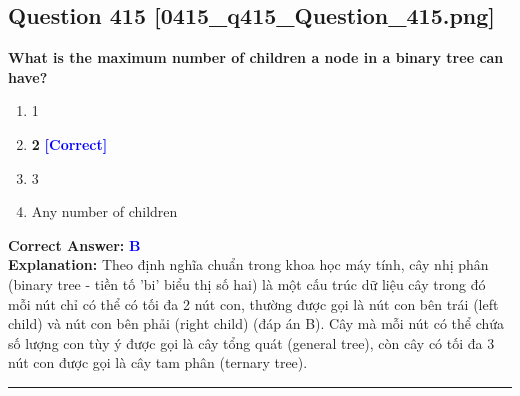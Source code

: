 \documentclass[11pt,a4paper]{article}
\begin{document}
\begin{minipage}{\textwidth}
\subsection*{Question 415 \quad \footnotesize{[0415\_q415\_Question\_415.png]}}
\noindent \textbf{What is the maximum number of children a node in a binary tree can have?}

\begin{enumerate}[label=\Alph*.]
    \item 1
    \item \textbf{2} \hfill \textcolor{blue}{\textbf{[Correct]}}
    \item 3
    \item Any number of children
\end{enumerate}

\noindent \textbf{Correct Answer:} \textcolor{blue}{\textbf{B}} \\[2pt]
\noindent \textbf{Explanation:} Theo định nghĩa chuẩn trong khoa học máy tính, cây nhị phân (binary tree - tiền tố 'bi' biểu thị số hai) là một cấu trúc dữ liệu cây trong đó mỗi nút chỉ có thể có tối đa 2 nút con, thường được gọi là nút con bên trái (left child) và nút con bên phải (right child) (đáp án B). Cây mà mỗi nút có thể chứa số lượng con tùy ý được gọi là cây tổng quát (general tree), còn cây có tối đa 3 nút con được gọi là cây tam phân (ternary tree).

\par\vspace{0.3cm}
\hrule
\vspace{0.3cm}
\end{minipage}
\end{document}
